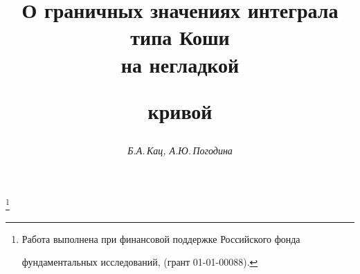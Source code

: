 









\newcommand{\gr}{\operatorname{gr}}


\newcommand{\h}{\operatorname{\frak h}}


\newcommand{\G}{\operatorname{\frak G}}


\newcommand{\GG}{\operatorname{\frak G\frak G}}


\newcommand{\RG}{\operatorname{\frak R\frak G}}


\newcommand{\RGG}{\operatorname{\frak R\frak G\frak G}}


\newcommand{\ROG}{\operatorname{\frak {R_{0}G}}}


\newcommand{\ROGG}{\operatorname{\frak {R_{0}GG}}}


\newcommand{\tts}[1]{}










\setcounter{page}{15}















\author{\it Б.А.\,Кац, А.Ю.\,Погодина}




\title{О граничных значениях интеграла типа Коши\\ на негладкой


кривой}


\thanks{Работа выполнена при финансовой поддержке Российского фонда


фундаментальных исследований, (грант 01-01-00088).}





